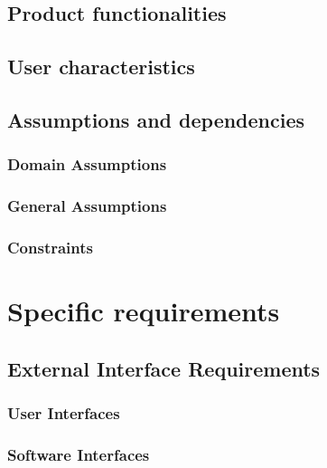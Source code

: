 \documentclass{article}
\begin{document}
\clearpage

\subsection{Product functionalities}


\subsection{User characteristics}



\subsection{Assumptions and dependencies}

\subsubsection{Domain Assumptions}


\subsubsection{General Assumptions}


\subsubsection{Constraints}


\clearpage
\section{Specific requirements}

\subsection{External Interface Requirements}

\subsubsection{User Interfaces}


\clearpage
\subsubsection{Software Interfaces}

\end{document}
